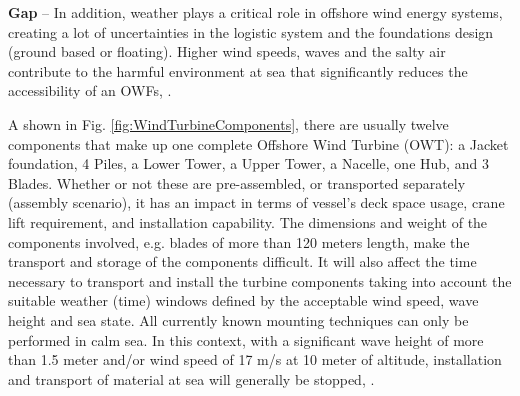 \textbf{Gap} --
In addition, weather plays a critical role in offshore wind energy systems, creating a lot of uncertainties in the logistic system and the foundations design (ground based or floating). Higher wind speeds, waves and the salty air contribute to the harmful environment at sea that significantly reduces the accessibility of an OWFs, \cite{Smit_2007, Walker_2013}.

A shown in Fig. \ref{fig:WindTurbineComponents}, there are usually twelve components that make up one complete Offshore Wind Turbine (OWT): a Jacket foundation, 4 Piles, a Lower Tower, a Upper Tower, a Nacelle, one Hub, and 3 Blades. Whether or not these are pre-assembled, or transported separately (assembly scenario), it has an impact in terms of vessel’s deck space usage, crane lift requirement, and installation capability. The dimensions and weight of the components involved, e.g. blades of more than 120 meters length, make the transport and storage of the components difficult. It will also affect the time necessary to transport and install the turbine components taking into account the suitable weather (time) windows defined by the acceptable wind speed, wave height and sea state. All currently known mounting techniques can only be performed in calm sea. In this context, with a significant wave height of more than 1.5 meter and/or wind speed of 17 m/s at 10 meter of altitude, installation and transport of material at sea will generally be stopped, \cite{aitsimulation}.

